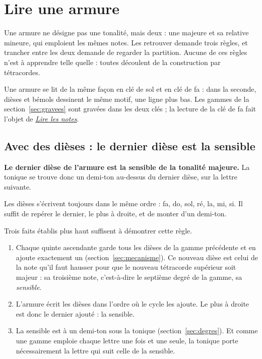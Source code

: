 \documentclass[a4paper,11pt]{article}
\begin{document}
\section{Lire une armure}
\label{sec:armure}

Une armure ne désigne pas une tonalité, mais deux : une majeure et sa relative
mineure, qui emploient les mêmes notes. Les retrouver demande trois règles, et
trancher entre les deux demande de regarder la partition. Aucune de ces règles
n'est à apprendre telle quelle : toutes découlent de la construction par
tétracordes.

Une armure se lit de la même façon en clé de sol et en clé de fa : dans la
seconde, dièses et bémols dessinent le même motif, une ligne plus bas. Les
gammes de la section~\ref{sec:gravees} sont gravées dans les deux clés ; la
lecture de la clé de fa fait l'objet de
\href{https://www.slashbin.net/musique/theorie/lecture.pdf}{\emph{Lire les
notes}}.

\subsection{Avec des dièses : le dernier dièse est la sensible}

\begin{remarque}
\textbf{Le dernier dièse de l'armure est la sensible de la tonalité majeure.}
La tonique se trouve donc un demi-ton au-dessus du dernier dièse, sur la
lettre suivante.
\end{remarque}

Les dièses s'écrivent toujours dans le même ordre : fa, do, sol, ré, la, mi,
si. Il suffit de repérer le dernier, le plus à droite, et de monter d'un
demi-ton.

\begin{center}

\end{center}

Trois faits établis plus haut suffisent à démontrer cette règle.
\begin{enumerate}
  \item Chaque quinte ascendante garde tous les dièses de la gamme précédente
    et en ajoute exactement un (section~\ref{sec:mecanisme}). Ce nouveau dièse
    est celui de la note qu'il faut hausser pour que le nouveau tétracorde
    supérieur soit majeur : sa troisième note, c'est-à-dire le septième degré
    de la gamme, sa \emph{sensible}.
  \item L'armure écrit les dièses dans l'ordre où le cycle les ajoute. Le plus
    à droite est donc le dernier ajouté : la sensible.
  \item La sensible est à un demi-ton sous la tonique
    (section~\ref{sec:degres}). Et comme une gamme emploie chaque lettre une
    fois et une seule, la tonique porte nécessairement la lettre qui suit celle
    de la sensible.
\end{enumerate}
\end{document}
